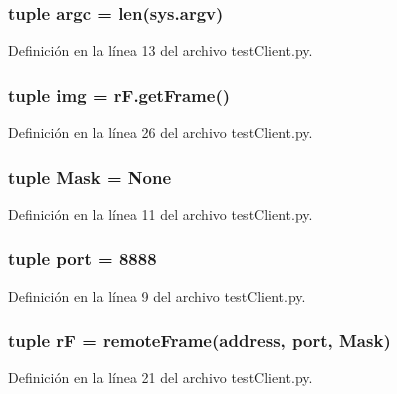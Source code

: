 \hypertarget{namespacetestClient_aad55a8f6b73a60a17d26dfc0d628f89a}{
\subsubsection[{argc}]{\setlength{\rightskip}{0pt plus 5cm}tuple argc = len(sys.\+argv)}}\label{namespacetestClient_aad55a8f6b73a60a17d26dfc0d628f89a}


Definición en la línea 13 del archivo test\+Client.\+py.

\hypertarget{namespacetestClient_aec8b285f81ee0dc468a6b86b4345e127}{
\subsubsection[{img}]{\setlength{\rightskip}{0pt plus 5cm}tuple img = r\+F.\+get\+Frame()}}\label{namespacetestClient_aec8b285f81ee0dc468a6b86b4345e127}


Definición en la línea 26 del archivo test\+Client.\+py.

\hypertarget{namespacetestClient_a09ad76b7b5cee406ff62ac1cdda80c27}{
\subsubsection[{Mask}]{\setlength{\rightskip}{0pt plus 5cm}tuple Mask = None}}\label{namespacetestClient_a09ad76b7b5cee406ff62ac1cdda80c27}


Definición en la línea 11 del archivo test\+Client.\+py.

\hypertarget{namespacetestClient_a1aadf525515ecfcf662c2aa51a503763}{
\subsubsection[{port}]{\setlength{\rightskip}{0pt plus 5cm}tuple port = 8888}}\label{namespacetestClient_a1aadf525515ecfcf662c2aa51a503763}


Definición en la línea 9 del archivo test\+Client.\+py.

\hypertarget{namespacetestClient_a0be24333dfe323a6c01b9f452cc8b142}{
\subsubsection[{r\+F}]{\setlength{\rightskip}{0pt plus 5cm}tuple r\+F = {\bf remote\+Frame}({\bf address}, {\bf port}, {\bf Mask})}}\label{namespacetestClient_a0be24333dfe323a6c01b9f452cc8b142}


Definición en la línea 21 del archivo test\+Client.\+py.

